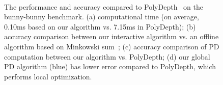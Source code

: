 \begin{figure}[htb]
  \centering
  \\
  \caption[The performance and accuracy compared to PolyDepth on bunny-bunny benchmark]{The performance and accuracy compared to PolyDepth~\protect\cite{Je:2012:PRP} on the bunny-bunny benchmark. (a) computational time (on average, 0.10ms based on our algorithm vs. 7.15ms in PolyDepth); (b) accuracy comparison between our interactive algorithm vs. an offline algorithm based on Minkowski sum~\protect\cite{Lien:2009:ASM}; (c) accuracy comparison of PD computation between our algorithm vs. PolyDepth; (d) our global PD algorithm (blue) has lower error compared to PolyDepth, which performs local optimization. }\label{fig:2:bunnymodels}
\end{figure}

